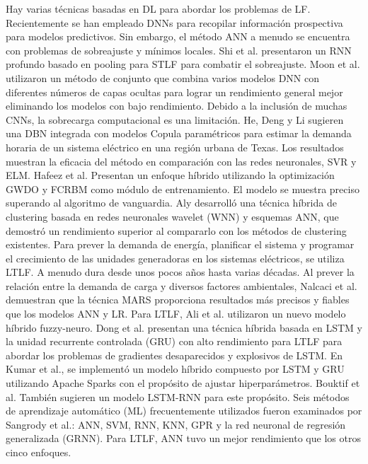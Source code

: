 \documentclass[crop=false]{standalone}
\begin{document}
{Hay varias técnicas basadas en DL para abordar los problemas de LF. Recientemente se han empleado DNNs para recopilar información prospectiva para modelos predictivos. Sin embargo, el método ANN a menudo se encuentra con problemas de sobreajuste y mínimos locales. Shi et al. presentaron un RNN profundo basado en pooling para STLF para combatir el sobreajuste.
Moon et al. utilizaron un método de conjunto que combina varios modelos DNN con diferentes números de capas ocultas para lograr un rendimiento general mejor eliminando los modelos con bajo rendimiento.
Debido a la inclusión de muchas CNNs, la sobrecarga computacional es una limitación. He, Deng y Li sugieren una DBN integrada con modelos Copula paramétricos para estimar la demanda horaria de un sistema eléctrico en una región urbana de Texas. Los resultados muestran la eficacia del método en comparación con las redes neuronales, SVR y ELM. Hafeez et al. Presentan un enfoque híbrido utilizando la optimización GWDO y FCRBM como módulo de entrenamiento. El modelo se muestra preciso superando al algoritmo de vanguardia. Aly desarrolló una técnica híbrida de clustering basada en redes neuronales wavelet (WNN) y esquemas ANN, que demostró un rendimiento superior al compararlo con los métodos de clustering existentes.
Para prever la demanda de energía, planificar el sistema y programar el crecimiento de las unidades generadoras en los sistemas eléctricos, se utiliza LTLF. A menudo dura desde unos pocos años hasta varias décadas.
Al prever la relación entre la demanda de carga y diversos factores ambientales, Nalcaci et al. demuestran que la técnica MARS proporciona resultados más precisos y fiables que los modelos ANN y LR. Para LTLF, Ali et al. utilizaron un nuevo modelo híbrido fuzzy-neuro. Dong et al. presentan una técnica híbrida basada en LSTM y la unidad recurrente controlada (GRU) con alto rendimiento para LTLF para abordar los problemas de gradientes desaparecidos y explosivos de LSTM. En Kumar et al., se implementó un modelo híbrido compuesto por LSTM y GRU utilizando Apache Sparks con el propósito de ajustar hiperparámetros. Bouktif et al. También sugieren un modelo LSTM-RNN para este propósito. Seis métodos de aprendizaje automático (ML) frecuentemente utilizados fueron examinados por Sangrody et al.: ANN, SVM, RNN, KNN, GPR y la red neuronal de regresión generalizada (GRNN). Para LTLF, ANN tuvo un mejor rendimiento que los otros cinco enfoques.}
\end{document}
